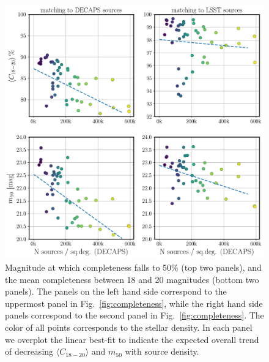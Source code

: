 \documentclass[DM,lsstdraft,toc,usenatbib,authoryear]{lsstdoc}
\begin{document}
\begin{figure}
\begin{centering}
\includegraphics[width=0.96\columnwidth]{figs/decaps_lsst_c1820_m50.png}
\caption{Magnitude at which completeness falls to 50\% (top two panels), and the mean completeness between 18 and 20 magnitudes (bottom two panels).  The panels on the left hand side correspond to the uppermost panel in Fig.~\ref{fig:completeness}, while the right hand side panels correspond to the second panel in Fig.~\ref{fig:completeness}. The color of all points corresponds to the stellar density. In each panel we overplot the linear best-fit to indicate the expected overall trend of decreasing $\langle C_{18-20} \rangle$ and  $m_{50}$ with source density. }
\label{fig:completeness_characterize}
\end{centering}
\end{figure}
\end{document}
